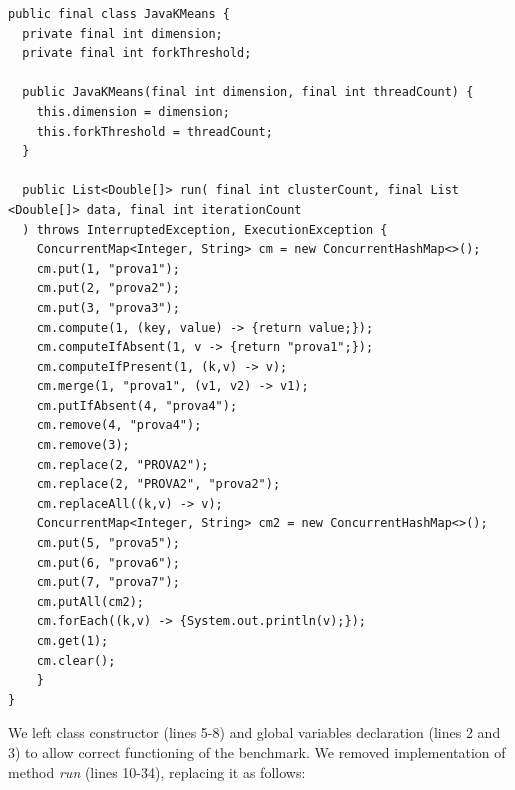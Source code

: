 \documentclass[]{usiinfthesis}
\begin{document}
\vspace*{0.25cm}
        \begin{verbatim}
public final class JavaKMeans {
  private final int dimension;
  private final int forkThreshold;

  public JavaKMeans(final int dimension, final int threadCount) {
    this.dimension = dimension;
    this.forkThreshold = threadCount;
  }

  public List<Double[]> run( final int clusterCount, final List <Double[]> data, final int iterationCount
  ) throws InterruptedException, ExecutionException {
    ConcurrentMap<Integer, String> cm = new ConcurrentHashMap<>();
    cm.put(1, "prova1");
    cm.put(2, "prova2");
    cm.put(3, "prova3");
    cm.compute(1, (key, value) -> {return value;});
    cm.computeIfAbsent(1, v -> {return "prova1";});
    cm.computeIfPresent(1, (k,v) -> v);
    cm.merge(1, "prova1", (v1, v2) -> v1);
    cm.putIfAbsent(4, "prova4");
    cm.remove(4, "prova4");
    cm.remove(3);
    cm.replace(2, "PROVA2");
    cm.replace(2, "PROVA2", "prova2");
    cm.replaceAll((k,v) -> v);
    ConcurrentMap<Integer, String> cm2 = new ConcurrentHashMap<>();
    cm.put(5, "prova5");
    cm.put(6, "prova6");
    cm.put(7, "prova7");
    cm.putAll(cm2);
    cm.forEach((k,v) -> {System.out.println(v);});
    cm.get(1);
    cm.clear();
    }
}
\end{verbatim}
\vspace*{0.25cm}
 We left class constructor (lines 5-8) and global variables declaration (lines 2 and 3) to allow correct functioning of the benchmark. We removed implementation of method \textit{run} (lines 10-34), replacing it as follows:
\end{document}

